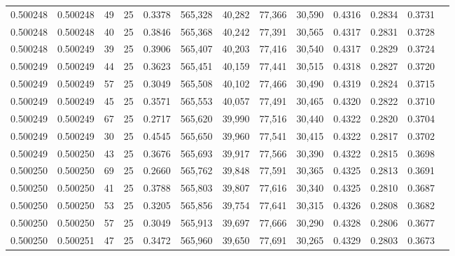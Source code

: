 \begin{tabular}{rrrrrrrrrrrrr}
0.500248 & 0.500248 &    49 &  25 &                                     0.3378 & 565,328 &  40,282 &  77,366 &  30,590 & 0.4316 & 0.2834 & 0.3731 \\
0.500248 & 0.500248 &    40 &  25 &                                     0.3846 & 565,368 &  40,242 &  77,391 &  30,565 & 0.4317 & 0.2831 & 0.3728 \\
0.500248 & 0.500249 &    39 &  25 &                                     0.3906 & 565,407 &  40,203 &  77,416 &  30,540 & 0.4317 & 0.2829 & 0.3724 \\
0.500249 & 0.500249 &    44 &  25 &                                     0.3623 & 565,451 &  40,159 &  77,441 &  30,515 & 0.4318 & 0.2827 & 0.3720 \\
0.500249 & 0.500249 &    57 &  25 &                                     0.3049 & 565,508 &  40,102 &  77,466 &  30,490 & 0.4319 & 0.2824 & 0.3715 \\
0.500249 & 0.500249 &    45 &  25 &                                     0.3571 & 565,553 &  40,057 &  77,491 &  30,465 & 0.4320 & 0.2822 & 0.3710 \\
0.500249 & 0.500249 &    67 &  25 &                                     0.2717 & 565,620 &  39,990 &  77,516 &  30,440 & 0.4322 & 0.2820 & 0.3704 \\
0.500249 & 0.500249 &    30 &  25 &                                     0.4545 & 565,650 &  39,960 &  77,541 &  30,415 & 0.4322 & 0.2817 & 0.3702 \\
0.500249 & 0.500250 &    43 &  25 &                                     0.3676 & 565,693 &  39,917 &  77,566 &  30,390 & 0.4322 & 0.2815 & 0.3698 \\
0.500250 & 0.500250 &    69 &  25 &                                     0.2660 & 565,762 &  39,848 &  77,591 &  30,365 & 0.4325 & 0.2813 & 0.3691 \\
0.500250 & 0.500250 &    41 &  25 &                                     0.3788 & 565,803 &  39,807 &  77,616 &  30,340 & 0.4325 & 0.2810 & 0.3687 \\
0.500250 & 0.500250 &    53 &  25 &                                     0.3205 & 565,856 &  39,754 &  77,641 &  30,315 & 0.4326 & 0.2808 & 0.3682 \\
0.500250 & 0.500250 &    57 &  25 &                                     0.3049 & 565,913 &  39,697 &  77,666 &  30,290 & 0.4328 & 0.2806 & 0.3677 \\
0.500250 & 0.500251 &    47 &  25 &                                     0.3472 & 565,960 &  39,650 &  77,691 &  30,265 & 0.4329 & 0.2803 & 0.3673 \\

\end{tabular}
